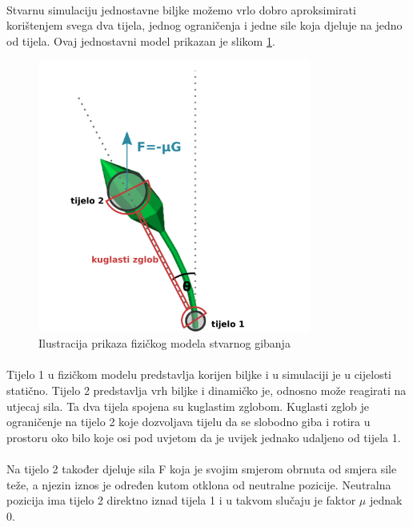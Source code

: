 \documentclass[times, utf8, diplomski]{fer}
\begin{document}
\paragraph{}
Stvarnu simulaciju jednostavne biljke možemo vrlo dobro aproksimirati korištenjem svega dva 
tijela, jednog ograničenja i jedne sile koja djeluje na jedno od tijela. Ovaj jednostavni model prikazan je slikom \ref{fig:32-1}.

\begin{figure}[h]
	\centering
	\includegraphics[width=0.8\textwidth]{img/32-1}
	\caption{Ilustracija prikaza fizičkog modela stvarnog gibanja}
	\label{fig:32-1}
\end{figure}

\paragraph{}
Tijelo 1 u fizičkom modelu predstavlja korijen biljke i u simulaciji je u cijelosti 
statično. Tijelo 2 predstavlja vrh biljke i dinamičko je, odnosno može reagirati na utjecaj
sila. Ta dva tijela spojena su kuglastim zglobom. Kuglasti zglob je ograničenje na tijelo 2 
koje dozvoljava tijelu da se slobodno giba i rotira u prostoru oko bilo koje osi pod uvjetom 
da je uvijek jednako udaljeno od tijela 1.

\paragraph{}
Na tijelo 2 također djeluje sila F koja je svojim smjerom obrnuta od smjera sile teže, a 
njezin iznos je određen kutom otklona od neutralne pozicije. Neutralna pozicija ima tijelo 2 
direktno iznad tijela 1 i u takvom slučaju je faktor $\mu$ jednak 0.
\end{document}
